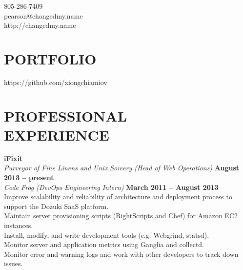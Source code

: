 \documentclass[margin,line]{resume}
\begin{document}
{
    \sc
    \hfill 805-286-7409                   \vspace{0mm}\\\vspace{0mm}%
    \hfill pearson@changedmy.name         \vspace{0mm}\\\vspace{0mm}%
    \hfill http://changedmy.name          \vspace{0mm}\\\vspace{-9mm}%
}

\begin{resume}

\vspace{6mm}

    \section{\mysidestyle \textbf{\large{P}\small{ORTFOLIO}}}

    https://github.com/xiongchiamiov

\sectionline

    \section{\mysidestyle \textbf{\large{P}\small{ROFESSIONAL\\EXPERIENCE}}}

    \textbf{\listing iFixit} \vspace{2mm}\\\vspace{1mm}%
    \textsl{Purveyor of Fine Linens and Unix Sorcery (Head of Web Operations)} \hfill \textbf{August 2013 -- present}\\
    \textsl{Code Frog (DevOps Engineering Intern)} \hfill \textbf{March 2011 -- August 2013}\\
    Improve scalability and reliability of architecture and deployment process to support the Dozuki SaaS platform.\\
    Maintain server provisioning scripts (RightScripts and Chef) for Amazon EC2 instances.\\
    Install, modify, and write development tools (e.g. Webgrind, statsd).\\
    Monitor server and application metrics using Ganglia and collectd.\\
    Monitor error and warning logs and work with other developers to track down issues.


\end{resume}
\end{document}

